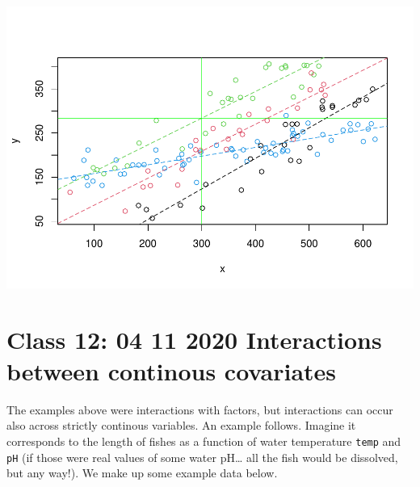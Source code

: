 \documentclass[
]{book}
\begin{document}
\includegraphics{ECOMODbook_files/figure-latex/a11.27-1.pdf}

\hypertarget{aula13}{%
\chapter{Class 12: 04 11 2020 Interactions between continous covariates}\label{aula13}}

The examples above were interactions with factors, but interactions can occur also across strictly continous variables. An example follows. Imagine it corresponds to the length of fishes as a function of water temperature \texttt{temp} and \texttt{pH} (if those were real values of some water pH\ldots{} all the fish would be dissolved, but any way!). We make up some example data below.
\end{document}
